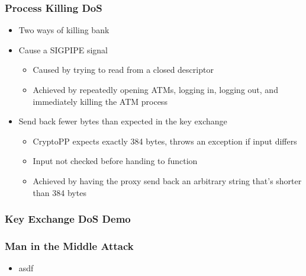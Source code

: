 \documentclass{beamer}
\begin{document}
\begin{frame}[fragile]
\frametitle{Process Killing DoS}
\begin{itemize}
\item Two ways of killing bank
\item Cause a SIGPIPE signal
\begin{itemize}
\item Caused by trying to read from a closed descriptor
\item Achieved by repeatedly opening ATMs, logging in, logging out, and immediately killing the ATM process
\end{itemize}
\item Send back fewer bytes than expected in the key exchange
\begin{itemize}
\item CryptoPP expects exactly 384 bytes, throws an exception if input differs
\item Input not checked before handing to function
\item Achieved by having the proxy send back an arbitrary string that's shorter than 384 bytes
\end{itemize}
\end{itemize}
\end{frame}

\begin{frame}[fragile]
\frametitle{Key Exchange DoS Demo}
\end{frame}

\begin{frame}[fragile]
\frametitle{Man in the Middle Attack}
\begin{itemize}
\item asdf
\end{itemize}
\end{frame}
\end{document}

